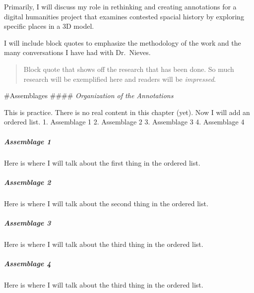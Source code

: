 \documentclass[
  openany]{book}
\begin{document}
Primarily, I will discuss my role in rethinking and creating annotations for a digital humanities project that examines contested spacial history by exploring specific places in a 3D model.

I will include block quotes to emphasize the methodology of the work and the many conversations I have had with Dr.~Nieves.

\begin{quote}
Block quote that shows off the research that has been done. So much research will be exemplified here and readers will be \emph{impressed}.
\end{quote}

\#Assemblages
\#\#\#\# \emph{Organization of the Annotations}

This is practice. There is no real content in this chapter (yet).
Now I will add an ordered list.
1. Assemblage 1
2. Assemblage 2
3. Assemblage 3
4. Assemblage 4

\hypertarget{assemblage-1}{%
\subparagraph{Assemblage 1}\label{assemblage-1}}

Here is where I will talk about the first thing in the ordered list.

\hypertarget{assemblage-2}{%
\subparagraph{Assemblage 2}\label{assemblage-2}}

Here is where I will talk about the second thing in the ordered list.

\hypertarget{assemblage-3}{%
\subparagraph{Assemblage 3}\label{assemblage-3}}

Here is where I will talk about the third thing in the ordered list.

\hypertarget{assemblage-4}{%
\subparagraph{Assemblage 4}\label{assemblage-4}}

Here is where I will talk about the third thing in the ordered list.
\end{document}

